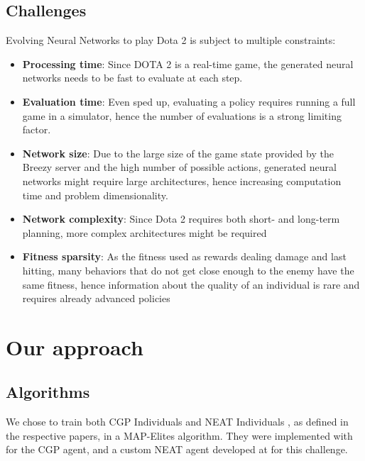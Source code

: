 \subsection{Challenges}
\begin{minipage}{\linewidth}
Evolving Neural Networks to play Dota 2 is subject to multiple constraints:
\begin{itemize}
    \item \textbf{Processing time}: Since DOTA 2 is a real-time game, the generated neural networks needs to be fast to evaluate at each step.
    \item \textbf{Evaluation time}: Even sped up, evaluating a policy requires running a full game in a simulator, hence the number of evaluations is a strong limiting factor.
    \item \textbf{Network size}: Due to the large size of the game state provided by the Breezy server and the high number of possible actions, generated neural networks might require large architectures, hence increasing computation time and problem dimensionality.
    \item\textbf{Network complexity}: Since Dota 2 requires both short- and long-term planning, more complex architectures might be required 
    \item \textbf{Fitness sparsity}: As the fitness used as rewards dealing damage and last hitting, many behaviors that do not get close enough to the enemy have the same fitness, hence information about the quality of an individual is rare and requires already advanced policies
\end{itemize}
\end{minipage}

\section{Our approach}

\subsection{Algorithms}
We chose to train both CGP Individuals  \cite{CGP} and NEAT Individuals \cite{NEAT_1}, as defined in the respective papers, in a MAP-Elites algorithm. They were implemented with  for the CGP agent, and a custom NEAT agent developed at  for this challenge.

